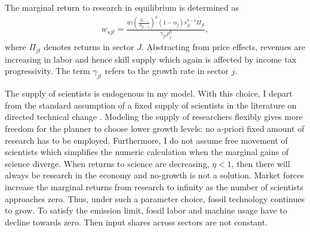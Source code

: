 The marginal return to research in equilibrium is determined as
\begin{align}
w_{sjt}= \frac{\eta \gamma \left(\frac{A_{t-1}}{A_{jt-1}}\right)^\phi (1-\alpha_j)s_{jt}^{\eta-1}\Pi_{jt}}{\gamma_{jt}\rho_j^\eta},
\end{align}
where $\Pi_{jt}$ denotes returns in sector $J$. Abstracting from price effects, revenues are increasing in labor and hence skill supply which again is affected by income tax progressivity. The term $\gamma_{jt}$ refers to the growth rate in sector $j$.

The supply of scientists is endogenous in my model. With this choice, I depart from the standard assumption of a fixed supply of scientists in the literature on directed technical change \cite{Acemoglu2012TheChange, Fried2018ClimateAnalysis}.  Modeling the supply of researchers flexibly gives more freedom for the planner to choose lower growth levels: no a-priori fixed amount of research has to be employed. Furthermore, I do not assume free movement of scientists which simplifies the numeric calculation when the marginal gains of science diverge. 
When returns to science are decreasing, $\eta<1$, then there will always be research in the economy and no-growth is not a solution. Market forces increase the marginal returns from research to infinity as the number of scientists approaches zero. Thus, under such a parameter choice, fossil technology continues to grow. To satisfy the emission limit, fossil labor and machine usage have to decline towards zero. 
Then input shares across sectors are not constant. 

\begin{comment}
\paragraph{Impossibility of reaching target in laissez-faire with exogenous growth}
\tr{Note that this is wrong! There is an option for the gov to affect inflation which then redirects demand.}
Note that with exogenous growth in each sector there is no possibility for the government to stop emissions from growing, since production of the dirty good is essential for the consumption good (no perfect substitution: $\varepsilon<\infty$). To meet the emission target, the government either needs to affect the growth rate in the economy; i.e., $\upsilon_j$ is a choice variable, or work and consumption need to be set to zero; or the emission target has to be defined in relative terms. The latter possibility contradicts the Paris Agreement which is concerned with absolute emissions.  
I therefore assume, that the government can change the growth rate.

The government chooses the growth rate in each sector, taking into account that research is constrained by an exogenous  amount of scientists
\begin{align}
\upsilon_{ct}+\upsilon_{dt}\leq\Upsilon
\end{align}
\end{comment} 
  
